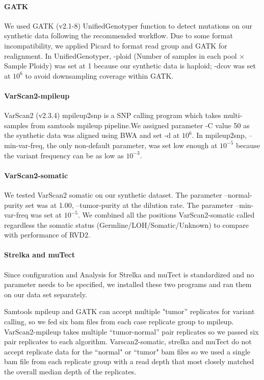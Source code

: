 \documentclass[11pt,reqno]{amsart}
\begin{document}
\paragraph{\textbf{GATK}}
We used GATK (v2.1-8) UnifiedGenotyper function to detect mutations on our synthetic data following the recommended workflow. Due to some format incompatibility, we applied Picard to format read group and GATK for realignment. In UnifiedGenotyper, -ploid (Number of samples in each pool $\times$ Sample Ploidy) was set at 1 because our synthetic data is haploid; -dcov was set at $10^6$ to avoid downsampling coverage within GATK.

\paragraph{\textbf{VarScan2-mpileup}}
VarScan2 (v2.3.4) mpileup2snp is a SNP calling program which takes multi-samples from samtools mpileup pipeline.We assigned parameter -C value 50 as the synthetic data was aligned using BWA and set -d at $10^6$. In mpileup2snp, --min-var-freq, the only non-default parameter, was set low enough at $10^{-5}$ because the variant frequency can be as low as $10^{-3}$.

\paragraph{\textbf{VarScan2-somatic}}
We tested VarScan2 somatic on our synthetic dataset. The parameter --normal-purity set was at 1.00, --tumor-purity at the dilution rate. The parameter --min-var-freq was set at $10^{-5}$. We combined all the positions VarScan2-somatic called regardless the somatic status (Germline/LOH/Somatic/Unknown) to compare with performance of RVD2.

\paragraph{\textbf{Strelka and muTect}}
Since configuration and Analysis for Strelka and muTect is standardized and no parameter needs to be specified, we installed these two programs and ran them on our data set separately.

Samtools mpileup and GATK can accept multiple "tumor'' replicates for variant calling, so we fed six bam files from each case replicate group to mpileup. VarScan2-mpileup takes multiple ``tumor-normal'' pair replicates so we passed six pair replicates to each algorithm. Varscan2-somatic, strelka and muTect do not accept replicate data for the ``normal" or ``tumor" bam files so we used a single bam file from each replicate group with a read depth that most closely matched the overall median depth of the replicates.
\end{document}
